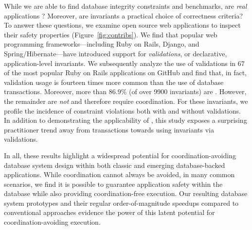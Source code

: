   While we are able to find \iconfluent database integrity constraints
  and benchmarks, are \textit{real} applications \iconfluent?
  Moreover, are invariants a practical choice of correctness criteria?
  To answer these questions, we examine open source web applications
  to inspect their safety properties (Figure~\ref{fig:contribs}). We
  find that popular web programming frameworks---including Ruby on
  Rails, Django, and Spring/Hibernate---have introduced support for
  \textit{validations}, or declarative, application-level
  invariants. We subsequently analyze the use of validations in 67 of
  the most popular Ruby on Rails applications on GitHub and find that,
  in fact, validation usage is fourteen times more common than the use
  of database transactions. Moreover, more than 86.9\% (of over 9900
  invariants) are \iconfluent. However, the remainder are \textit{not}
  \iconfluent and therefore require coordination. For these
  invariants, we profile the incidence of constraint violations both
  with and without validations. In addition to demonstrating the
  applicability of \iconfluence, this study exposes a surprising
  practitioner trend away from transactions towards using invariants via
  validations.\vspace{.5em}

  In all, these results highlight a widespread potential for
  coordination-avoiding database system design within both classic and
  emerging database-backed applications. While coordination cannot
  always be avoided, in many common scenarios, we find it is possible to
  guarantee application safety within the database while also
  providing coordination-free execution. Our resulting database system
  prototypes and their regular order-of-magnitude speedups compared to
  conventional approaches evidence the power of this latent potential
  for coordination-avoiding execution.

